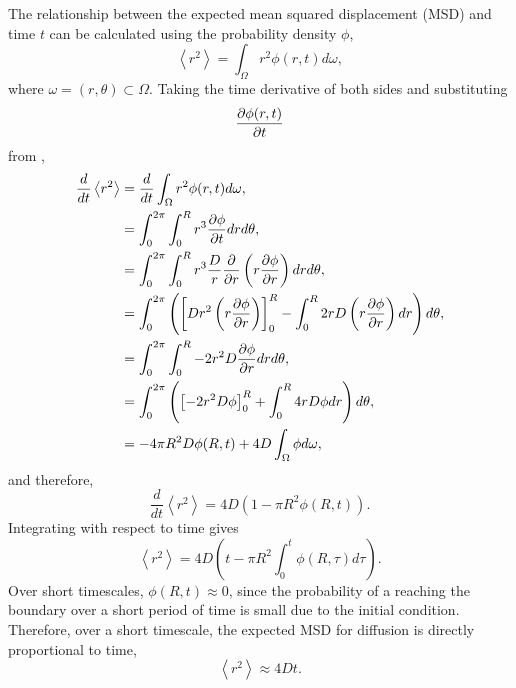 The relationship between the expected mean squared displacement (MSD) and time $t$
can be calculated using the probability density $\phi$,
%
\begin{equation}
\left<r^2\right> = \int_{\Omega}r^2 \phi(r,t) d\omega ,
\label{eqn:MSD_expectation}
\end{equation}
%
where $\omega = (r,\theta) \subset \Omega$. Taking the time derivative of both
sides and substituting
\begin{equation}
    \frac{\partial \phi(r,t)}{\partial t}
\end{equation} from ,
%
\begin{align}
\frac{d}{dt} \left<r^2\right> &= \frac{d}{dt}\int_{\Omega}r^2 \phi(r,t) d\omega ,\\
                           &= \int_0^{2\pi} \int_0^{R} r^3 \frac{\partial \phi}{\partial t} dr d\theta ,\\
                            &= \int_0^{2\pi} \int_0^{R} r^3 \frac{D}{r} \frac{\partial }{\partial r } \left( r \frac{\partial  \phi}{\partial  r}\right) dr d\theta , \\
                            &= \int_0^{2\pi} \left( \left[ D r^2 \left( r \frac{\partial  \phi}{\partial  r}\right) \right]_0^{R} - \int_0^{R} 2rD \left(r \frac{\partial \phi}{\partial r} \right) dr \right) d\theta , \\
                            &= \int_0^{2\pi} \int_0^{R} -2r^2D \frac{\partial  \phi}{\partial r}dr d\theta , \\
                            &= \int_0^{2\pi} \left( \left[-2r^2D \phi \right]_0^{R} + \int_0^{R} 4rD \phi dr \right)d\theta , \\
                            &= - 4\pi R^2D \phi(R,t) + 4D \int_{\Omega} \phi d\omega ,
\label{eqn:diffusion_1}
\end{align}
%
and therefore,
\begin{equation}
\frac{d}{dt} \left<r^2\right>  = 4D( 1- \pi R^2 \phi(R,t)) .
\end{equation}
%
Integrating with respect to time gives
%
\begin{equation}
\left<r^2\right> = 4D \left( t - \pi R^2 \int_0^t \phi(R,\tau) d \tau \right).
\label{eqn:diffusion_msd}
\end{equation}
%
Over short timescales, $\phi(R,t) \approx 0$, since the probability of a reaching the boundary over a short period of time is small due to the initial condition. Therefore, over a short timescale, the expected MSD for diffusion is directly proportional to time,
%
\begin{equation}
\left<r^2\right> \approx 4Dt.
\label{eqn:diffusion_short}
\end{equation}
%
